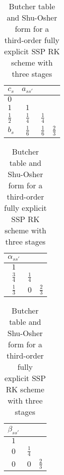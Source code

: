 \begin{table}[t]
\caption{Butcher table and Shu-Osher form for a third-order fully explicit SSP RK scheme with three stages}
\begin{subtable}{\linewidth}
\begin{tabular}{lccc}
$c_s$ & $a_{ss'}$ & & \\
\hline
$0$ & & &  \\
$1$ & $1$ &  & \\
$\frac{1}{2}$ & $\frac{1}{4}$ & $\frac{1}{4}$ & \\
\hline
$b_s$ & $\frac{1}{6}$ & $\frac{1}{6}$ & $\frac{2}{3}$  \\ 
\end{tabular}
\label{tb:Butcher_tbl_EXRK_SSPo3s3}
\end{subtable}
\vspace{.5cm}

\begin{subtable}{\linewidth}
\begin{tabular}{ccc}
$\alpha_{ss'}$ & & \\
\hline
$1$ & &  \\
$\frac{3}{4}$ & $\frac{1}{4}$ & \\
$\frac{1}{3}$ & $0$ & $\frac{2}{3}$ \\
\hline
\end{tabular}
\hspace{.5cm}
\begin{tabular}{ccc}
$\beta_{ss'}$ & & \\
\hline
$1$ & &  \\
$0$ & $\frac{1}{4}$ & \\
$0$ & $0$ & $\frac{2}{3}$ \\
\hline
\end{tabular}
\label{tb:ShuOsher_tbl_EXRK_SSPo3s3}
\end{subtable}
\end{table}

